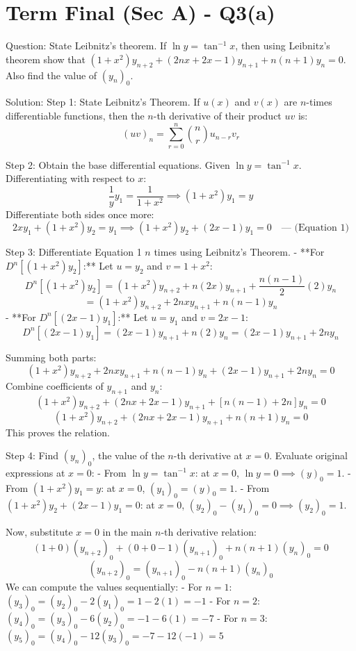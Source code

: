 \documentclass{article}
\begin{document}
\section*{Term Final (Sec A) - Q3(a)}
Question:
State Leibnitz's theorem. If $\ln y = \tan^{-1} x$, then using Leibnitz's theorem show that $(1+x^2)y_{n+2} + (2nx + 2x - 1)y_{n+1} + n(n+1)y_n = 0$. Also find the value of $(y_n)_0$.

Solution:
Step 1: State Leibnitz's Theorem.
If $u(x)$ and $v(x)$ are $n$-times differentiable functions, then the $n$-th derivative of their product $uv$ is:
\[
(uv)_n = \sum_{r=0}^n \binom{n}{r} u_{n-r} v_r
\]

Step 2: Obtain the base differential equations.
Given $\ln y = \tan^{-1} x$. Differentiating with respect to $x$:
\[
\frac{1}{y} y_1 = \frac{1}{1+x^2} \implies (1+x^2)y_1 = y
\]
Differentiate both sides once more:
\[
2x y_1 + (1+x^2)y_2 = y_1 \implies (1+x^2)y_2 + (2x - 1)y_1 = 0 \quad \text{--- (Equation 1)}
\]

Step 3: Differentiate Equation 1 $n$ times using Leibnitz's Theorem.
- **For $D^n[(1+x^2)y_2]$:**
  Let $u = y_2$ and $v = 1+x^2$:
  \[
  D^n[(1+x^2)y_2] = (1+x^2)y_{n+2} + n(2x)y_{n+1} + \frac{n(n-1)}{2}(2)y_n
  \]
  \[
  = (1+x^2)y_{n+2} + 2nx y_{n+1} + n(n-1)y_n
  \]
- **For $D^n[(2x-1)y_1]$:**
  Let $u = y_1$ and $v = 2x-1$:
  \[
  D^n[(2x-1)y_1] = (2x-1)y_{n+1} + n(2)y_n = (2x-1)y_{n+1} + 2ny_n
  \]

Summing both parts:
\[
(1+x^2)y_{n+2} + 2nx y_{n+1} + n(n-1)y_n + (2x-1)y_{n+1} + 2ny_n = 0
\]
Combine coefficients of $y_{n+1}$ and $y_n$:
\[
(1+x^2)y_{n+2} + (2nx + 2x - 1)y_{n+1} + [n(n-1) + 2n]y_n = 0
\]
\[
(1+x^2)y_{n+2} + (2nx + 2x - 1)y_{n+1} + n(n+1)y_n = 0
\]
This proves the relation.

Step 4: Find $(y_n)_0$, the value of the $n$-th derivative at $x = 0$.
Evaluate original expressions at $x = 0$:
- From $\ln y = \tan^{-1} x$: at $x=0$, $\ln y = 0 \implies (y)_0 = 1$.
- From $(1+x^2)y_1 = y$: at $x=0$, $(y_1)_0 = (y)_0 = 1$.
- From $(1+x^2)y_2 + (2x-1)y_1 = 0$: at $x=0$, $(y_2)_0 - (y_1)_0 = 0 \implies (y_2)_0 = 1$.

Now, substitute $x = 0$ in the main $n$-th derivative relation:
\[
(1+0) (y_{n+2})_0 + (0 + 0 - 1)(y_{n+1})_0 + n(n+1)(y_n)_0 = 0
\]
\[
(y_{n+2})_0 = (y_{n+1})_0 - n(n+1)(y_n)_0
\]
We can compute the values sequentially:
- For $n=1$: $(y_3)_0 = (y_2)_0 - 2(y_1)_0 = 1 - 2(1) = -1$
- For $n=2$: $(y_4)_0 = (y_3)_0 - 6(y_2)_0 = -1 - 6(1) = -7$
- For $n=3$: $(y_5)_0 = (y_4)_0 - 12(y_3)_0 = -7 - 12(-1) = 5$
\end{document}
